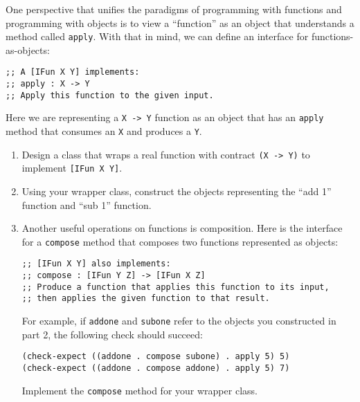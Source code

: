 \documentclass[12pt]{article}                   %
\def\pts#1{\marginpar{\footnotesize \raggedright  \fbox{#1 {\sc Points}}}}
\newenvironment{solution}{}{}
\newcommand\code[1]{\texttt{#1}}
\begin{document}
\begin{problem}\pts{??}

One perspective that unifies the paradigms of programming with
functions and programming with objects is to view a ``function'' as an
object that understands a method called \code{apply}.  With that in
mind, we can define an interface for functions-as-objects:

\begin{verbatim}
;; A [IFun X Y] implements:
;; apply : X -> Y
;; Apply this function to the given input.
\end{verbatim}

Here we are representing a \code{X -> Y} function as an object that
has an \code{apply} method that consumes an \code{X} and produces a
\code{Y}.

\begin{enumerate}
\item Design a class that wraps a real function with contract \code{(X
  -> Y)} to implement \code{[IFun X Y]}.

\item Using your wrapper class, construct the objects representing the
  ``add 1'' function and ``sub 1'' function.

\item Another useful operations on functions is composition.  Here is
  the interface for a \code{compose} method that composes two functions
  represented as objects:

\begin{verbatim}
;; [IFun X Y] also implements:
;; compose : [IFun Y Z] -> [IFun X Z]
;; Produce a function that applies this function to its input, 
;; then applies the given function to that result.
\end{verbatim}

For example, if \code{addone} and \code{subone} refer to the objects
you constructed in part 2, the following check should succeed:

\begin{verbatim}
(check-expect ((addone . compose subone) . apply 5) 5)
(check-expect ((addone . compose addone) . apply 5) 7)
\end{verbatim}

Implement the \code{compose} method for your wrapper class.
\end{enumerate}

\begin{solution}


\end{solution}
\end{problem}
\end{document}
